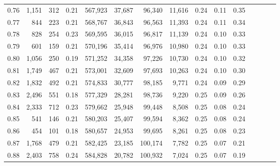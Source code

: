 \begin{tabular}{rrrcrrrrrrrrrrr}
0.76 &   1,151 &    312 &                                       0.21 &  567,923 &   37,687 &   96,340 &   11,616 &  0.24 &  0.11 &                         0.35 \\
0.77 &     844 &    223 &                                       0.21 &  568,767 &   36,843 &   96,563 &   11,393 &  0.24 &  0.11 &                         0.34 \\
0.78 &     828 &    254 &                                       0.23 &  569,595 &   36,015 &   96,817 &   11,139 &  0.24 &  0.10 &                         0.33 \\
0.79 &     601 &    159 &                                       0.21 &  570,196 &   35,414 &   96,976 &   10,980 &  0.24 &  0.10 &                         0.33 \\
0.80 &   1,056 &    250 &                                       0.19 &  571,252 &   34,358 &   97,226 &   10,730 &  0.24 &  0.10 &                         0.32 \\
0.81 &   1,749 &    467 &                                       0.21 &  573,001 &   32,609 &   97,693 &   10,263 &  0.24 &  0.10 &                         0.30 \\
0.82 &   1,832 &    492 &                                       0.21 &  574,833 &   30,777 &   98,185 &    9,771 &  0.24 &  0.09 &                         0.29 \\
0.83 &   2,496 &    551 &                                       0.18 &  577,329 &   28,281 &   98,736 &    9,220 &  0.25 &  0.09 &                         0.26 \\
0.84 &   2,333 &    712 &                                       0.23 &  579,662 &   25,948 &   99,448 &    8,508 &  0.25 &  0.08 &                         0.24 \\
0.85 &     541 &    146 &                                       0.21 &  580,203 &   25,407 &   99,594 &    8,362 &  0.25 &  0.08 &                         0.24 \\
0.86 &     454 &    101 &                                       0.18 &  580,657 &   24,953 &   99,695 &    8,261 &  0.25 &  0.08 &                         0.23 \\
0.87 &   1,768 &    479 &                                       0.21 &  582,425 &   23,185 &  100,174 &    7,782 &  0.25 &  0.07 &                         0.21 \\
0.88 &   2,403 &    758 &                                       0.24 &  584,828 &   20,782 &  100,932 &    7,024 &  0.25 &  0.07 &                         0.19 \\

\end{tabular}
